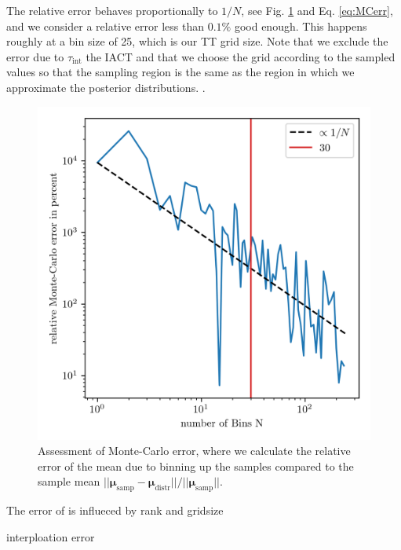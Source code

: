 The relative error behaves proportionally to $1/N$, see Fig. \ref{fig:MCError} and Eq. \ref{eq:MCerr}, and we consider a relative error less than $0.1\%$ good enough.
This happens roughly at a bin size of 25, which is our TT grid size.
Note that we exclude the error due to $\tau_{\text{int}}$ the IACT and that we choose the grid according to the sampled values so that the sampling region is the same as the region in which we approximate the posterior distributions.
.\begin{figure}[ht!]
	\centering
	\includegraphics{MeanAssPT.png}
	\caption[Assessment of Monte-Carlo error.]{Assessment of Monte-Carlo error, where we calculate the relative error of the mean due to binning up the samples compared to the sample mean $||\bm{\mu}_{\text{samp}} -\bm{\mu}_{\text{distr}} ||/ || \bm{\mu}_{\text{samp}}||$.}
	\label{fig:MCError}
\end{figure}
The error of is influeced by rank and gridsize

interploation error


